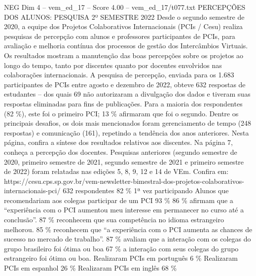 \begin{textsample}{NEG Dim 4 – vem\_ed\_17 – Score 4.00 – vem\_ed\_17/t077.txt}  \label{ex:f4_neg_083}
PERCEPÇÕES DOS ALUNOS: PESQUISA 2º SEMESTRE 2022 Desde o segundo semestre de 2020, a equipe dos Projetos Colaborativos Internacionais (PCIs / Cesu) realiza pesquisas de percepção com alunos e professores participantes de PCIs, para avaliação e melhoria contínua dos processos de gestão dos Intercâmbios Virtuais.
Os resultados mostram a manutenção das boas percepções sobre os projetos ao longo do tempo, tanto por discentes quanto por docentes envolvidos nas colaborações internacionais.
A pesquisa de percepção, enviada para os 1.683 participantes de PCIs entre agosto e dezembro de 2022, obteve 632 respostas de estudantes – dos quais 69 não autorizaram a divulgação dos dados e tiveram suas respostas eliminadas para fins de publicações.
Para a maioria dos respondentes (82 \%), este foi o primeiro PCI; 13 \% afirmaram que foi o segundo.
Dentre os principais desafios, os dois mais mencionados foram gerenciamento de tempo (248 respostas) e comunicação (161), repetindo a tendência dos anos anteriores.
Nesta página, confira a síntese dos resultados relativos aos discentes.
Na página 7, conheça a percepção dos docentes.
Pesquisas anteriores (segundo semestre de 2020, primeiro semestre de 2021, segundo semestre de 2021 e primeiro semestre de 2022) foram relatadas nas edições 5, 8, 9, 12 e 14 de VEm.
Confira em: https://cesu.cps.sp.gov.br/vem-newsletter-bimestral-dos-projetos-colaborativos-internacionais-pci/ 632 respondentes 82 \% 1ª vez participando Alunos que recomendariam aos colegas participar de um PCI 93 \% 86 \% afirmam que a “experiência com o PCI aumentou meu interesse em permanecer no curso até a conclusão”. 87 \% reconhecem que sua competência no idioma estrangeiro melhorou. 85 \% reconhecem que “a experiência com o PCI aumenta as chances de sucesso no mercado de trabalho”. 87 \% avaliam que a interação com os colegas do grupo brasileiro foi ótima ou boa 67 \% a interação com seus colegas do grupo estrangeiro foi ótima ou boa.
Realizaram PCIs em português 6 \% Realizaram PCIs em espanhol 26 \% Realizaram PCIs em inglês 68 \%

\end{textsample}
